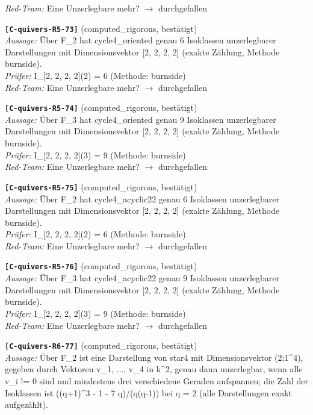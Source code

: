 \documentclass[11pt]{article}
\theoremstyle{definition}\newtheorem{definition}[theorem]{Definition}\newtheorem{remark}[theorem]{Remark}\newtheorem{observation}[theorem]{Numerical observation}
\begin{document}
\textit{Red-Team:} Eine Unzerlegbare mehr? $\to$ durchgefallen\par\medskip
\noindent\textbf{\texttt{[C-quivers-R5-73]}} (computed\_rigorous, bestätigt)\\
\textit{Aussage:} Über F\_2 hat cycle4\_oriented genau 6 Isoklassen unzerlegbarer Darstellungen mit Dimensionsvektor [2, 2, 2, 2] (exakte Zählung, Methode burnside).\\
\textit{Prüfer:} I\_[2, 2, 2, 2](2) = 6 (Methode: burnside)\\
\textit{Red-Team:} Eine Unzerlegbare mehr? $\to$ durchgefallen\par\medskip
\noindent\textbf{\texttt{[C-quivers-R5-74]}} (computed\_rigorous, bestätigt)\\
\textit{Aussage:} Über F\_3 hat cycle4\_oriented genau 9 Isoklassen unzerlegbarer Darstellungen mit Dimensionsvektor [2, 2, 2, 2] (exakte Zählung, Methode burnside).\\
\textit{Prüfer:} I\_[2, 2, 2, 2](3) = 9 (Methode: burnside)\\
\textit{Red-Team:} Eine Unzerlegbare mehr? $\to$ durchgefallen\par\medskip
\noindent\textbf{\texttt{[C-quivers-R5-75]}} (computed\_rigorous, bestätigt)\\
\textit{Aussage:} Über F\_2 hat cycle4\_acyclic22 genau 6 Isoklassen unzerlegbarer Darstellungen mit Dimensionsvektor [2, 2, 2, 2] (exakte Zählung, Methode burnside).\\
\textit{Prüfer:} I\_[2, 2, 2, 2](2) = 6 (Methode: burnside)\\
\textit{Red-Team:} Eine Unzerlegbare mehr? $\to$ durchgefallen\par\medskip
\noindent\textbf{\texttt{[C-quivers-R5-76]}} (computed\_rigorous, bestätigt)\\
\textit{Aussage:} Über F\_3 hat cycle4\_acyclic22 genau 9 Isoklassen unzerlegbarer Darstellungen mit Dimensionsvektor [2, 2, 2, 2] (exakte Zählung, Methode burnside).\\
\textit{Prüfer:} I\_[2, 2, 2, 2](3) = 9 (Methode: burnside)\\
\textit{Red-Team:} Eine Unzerlegbare mehr? $\to$ durchgefallen\par\medskip
\noindent\textbf{\texttt{[C-quivers-R6-77]}} (computed\_rigorous, bestätigt)\\
\textit{Aussage:} Über F\_2 ist eine Darstellung von star4 mit Dimensionsvektor (2;1\textasciicircum{}4), gegeben durch Vektoren v\_1, ..., v\_4 in k\textasciicircum{}2, genau dann unzerlegbar, wenn alle v\_i != 0 sind und mindestens drei verschiedene Geraden aufspannen; die Zahl der Isoklassen ist ((q+1)\textasciicircum{}3 - 1 - 7 q)/(q(q-1)) bei q = 2 (alle Darstellungen exakt aufgezählt).\\
\end{document}
